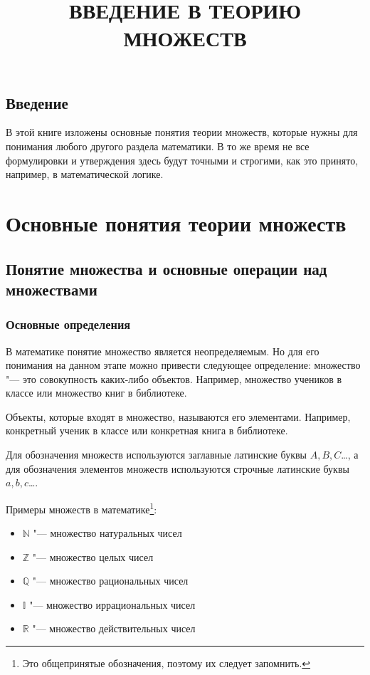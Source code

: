 \documentclass[a4paper, 16pt, oneside]{book}
\title{ВВЕДЕНИЕ В ТЕОРИЮ МНОЖЕСТВ}
\date{}
\begin{document}
\maketitle{}

\tableofcontents{}
\clearpage

\section*{Введение}
В этой книге изложены основные понятия теории множеств, которые нужны для понимания любого другого раздела математики.
В то же время не все формулировки и утверждения здесь будут точными и строгими, как это принято, например, в математической логике.
\clearpage

\chapter{Основные понятия теории множеств}

\section{Понятие множества и основные операции над множествами}

\subsection{Основные определения}

\par В математике понятие множество является неопределяемым.
Но для его понимания на данном этапе можно привести следующее определение: множество "--- это совокупность каких-либо объектов. Например, множество учеников в классе или множество книг в библиотеке.
\par Объекты, которые входят в множество, называются его элементами. Например, конкретный ученик в классе или конкретная книга в библиотеке.
\par Для обозначения множеств используются заглавные латинские буквы \(A, B, C\)\ldots,
а для обозначения элементов множеств используются строчные латинские буквы \(a, b, c\)\ldots.

\par Примеры множеств в математике\footnote{Это общепринятые обозначения, поэтому их следует запомнить.}:
\begin{itemize}
    \item \(\mathbb{N}\) "--- множество натуральных чисел
    \item \(\mathbb{Z}\) "--- множество целых чисел
    \item \(\mathbb{Q}\) "--- множество рациональных чисел
    \item \(\mathbb{I}\) "--- множество иррациональных чисел
    \item \(\mathbb{R}\) "--- множество действительных чисел
\end{itemize}
\end{document}

